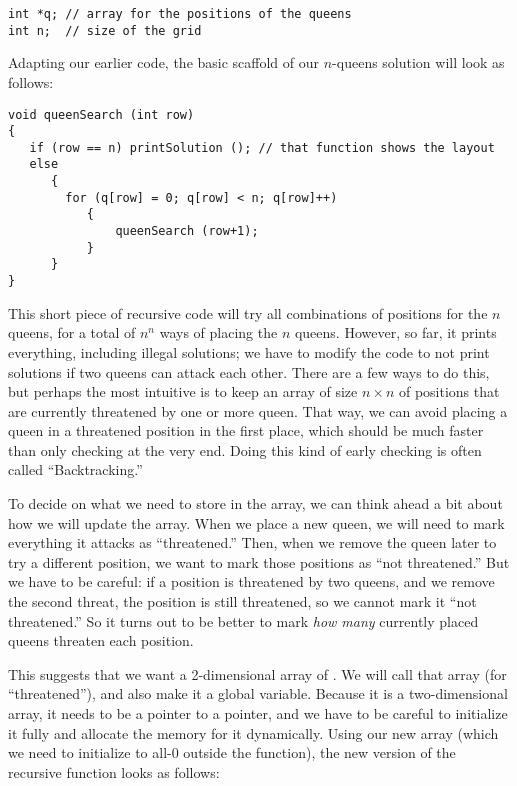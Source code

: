 \begin{verbatim}
int *q; // array for the positions of the queens
int n;  // size of the grid
\end{verbatim}

Adapting our earlier  code, the basic scaffold of
our $n$-queens solution will look as follows:

\begin{verbatim}
void queenSearch (int row)
{
   if (row == n) printSolution (); // that function shows the layout
   else
      {
        for (q[row] = 0; q[row] < n; q[row]++)
           {
               queenSearch (row+1);
           }
      }
}
\end{verbatim}

This short piece of recursive code will try all combinations of
positions for the $n$ queens, for a total of $n^n$ ways of placing
the $n$ queens. 
However, so far, it prints everything, including illegal solutions;
we have to modify the code to not print solutions if two queens can
attack each other.
There are a few ways to do this, but perhaps the most intuitive is to
keep an array of size $n \times n$ of positions that are currently
threatened by one or more queen.
That way, we can avoid placing a queen in a threatened position in the
first place, which should be much faster than only checking at the
very end.
Doing this kind of early checking is often called ``Backtracking.''

To decide on what we need to store in the array, we can think ahead a
bit about how we will update the array.
When we place a new queen, we will need to mark everything it
attacks as ``threatened.''
Then, when we remove the queen later to try a different position,
we want to mark those positions as ``not threatened.''
But we have to be careful: if a position is threatened by two queens,
and we remove the second threat, the position is still threatened, so
we cannot mark it ``not threatened.''
So it turns out to be better to mark \emph{how many} currently placed
queens threaten each position.

This suggests that we want a 2-dimensional array of .
We will call that array  (for ``threatened''),
and also make it a global variable.
Because it is a two-dimensional array, it needs to be a pointer to a
pointer, and we have to be careful to initialize it fully and allocate
the memory for it dynamically.
Using our new array  (which we need to initialize to all-0
outside the  function), the new version of
the recursive function looks as follows:

